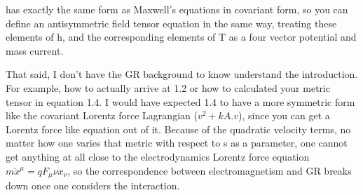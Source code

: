 has exactly the same form as Maxwell's equations in covariant form, so you can define an antisymmetric field tensor equation in the same way, treating these elements of h, and the corresponding elements of T as a four vector potential and mass current.

That said, I don't have the GR background to know understand the introduction.  For example, how to actually arrive at 1.2
or how to calculated your metric tensor in equation 1.4.  I would have expected 1.4 to have a more symmetric form like the covariant Lorentz force Lagrangian ($v^2 + kA.v$), since you can get a Lorentz force like equation out of it.  Because of the quadratic velocity terms, no matter how one varies that metric with respect to s as a parameter, one cannot get anything at all close to the electrodynamics Lorentz force equation $m\ddot{x}^\mu = q F_\mu\nu \dot{x}_\nu$, so the correspondence between electromagnetism and GR breaks down once one considers the interaction.
